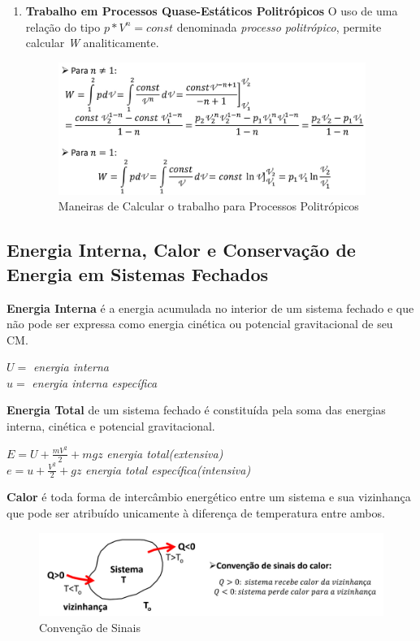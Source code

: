 \documentclass[a4paper, 12pt]{article}
\begin{document}
\begin{enumerate}
		\newpage
		\item \textbf{Trabalho em Processos Quase-Estáticos Politrópicos} O uso de uma relação do tipo $ p*V^{n} = const $ denominada \textit{processo politrópico}, permite calcular \textit{W} analiticamente.
			\begin{figure}[h]
				\includegraphics[width = 10cm]{pp.png}
				\centering
				\caption{Maneiras de Calcular o trabalho para Processos Politrópicos}
			\end{figure}
		 
	\end{enumerate}

\subsection{Energia Interna, Calor e Conservação de Energia em Sistemas Fechados}
\textbf{Energia Interna} é a energia acumulada no interior de um sistema fechado e que não pode ser expressa como energia cinética ou potencial gravitacional de seu CM.

	\begin{center}
		\large
		$ U =  $\textit{ energia interna}\\
		$ u =  $\textit{ energia interna específica}
	\end{center}

\textbf{Energia Total} de um sistema fechado é constituída pela soma das energias interna,
cinética e potencial gravitacional.
	\begin{center}
		\large
		$ E = U + \frac{mV^{2}}{2} + mgz$ \textit{energia total(extensiva)}\\
		$ e = u + \frac{V^{2}}{2} + gz$ \textit{energia total específica(intensiva)}
	\end{center}

\textbf{Calor} é toda forma de intercâmbio energético entre um sistema e sua
vizinhança que pode ser atribuído unicamente à diferença de temperatura entre ambos.
	\begin{figure}[h]
		\includegraphics[width = 15cm]{ca.png}
		\centering
		\caption{Convenção de Sinais}
	\end{figure}
\end{document}
